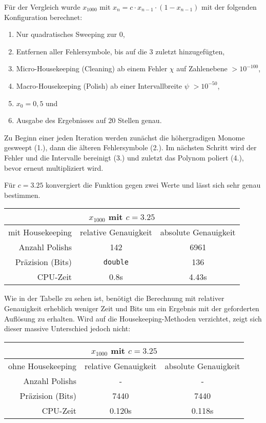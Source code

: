 Für der Vergleich wurde $x_{1000}$ mit $x_n = c \cdot x_{n-1} \cdot (1 - x_{n-1})$ mit der folgenden Konfiguration berechnet:
\begin{enumerate}
 \item Nur quadratisches Sweeping zur 0,
 \item Entfernen aller Fehlersymbole, bis auf die 3 zuletzt hinzugefügten,
 \item Micro-Housekeeping (Cleaning) ab einem Fehler $\chi$ auf Zahlenebene $>10^{-100}$,
 \item Macro-Housekeeping (Polish) ab einer Intervallbreite $\psi$ $>10^{-50}$,
 \item $x_0 = 0,5$ und
 \item Ausgabe des Ergebnisses auf 20 Stellen genau.
\end{enumerate}
Zu Beginn einer jeden Iteration werden zunächst die höhergradigen Monome gesweept (1.), dann die älteren Fehlersymbole (2.). Im nächsten Schritt wird der Fehler und die Intervalle bereinigt (3.) und zuletzt das Polynom poliert (4.), bevor erneut multipliziert wird. 

Für $c = 3.25$ konvergiert die Funktion gegen zwei Werte und lässt sich sehr genau bestimmen.

\begin{center}
\begin{tabular}{|r|c|c|}
\hline
\multicolumn{3}{|c|}{$x_{1000}$ mit $c=3.25$}\\
\hline
 mit Housekeeping&relative Genauigkeit & absolute Genauigkeit \\
 \hline
 \hline
 Anzahl Polishs & 142 & 6961 \\
 Präzision (Bits) & \verb+double+ & 136 \\
 CPU-Zeit & 0.8s & 4.43s\\
 \hline
\end{tabular}
\end{center}

Wie in der Tabelle zu sehen ist, benötigt die Berechnung mit relativer Genauigkeit erheblich weniger Zeit und Bits um ein Ergebnis mit der geforderten Auflösung zu erhalten. Wird auf die Housekeeping-Methoden verzichtet, zeigt sich dieser massive Unterschied jedoch nicht:

\begin{center}
\begin{tabular}{|r|c|c|}
\hline
\multicolumn{3}{|c|}{$x_{1000}$ mit $c=3.25$}\\
\hline
 ohne Housekeeping &relative Genauigkeit & absolute Genauigkeit \\
 \hline
 \hline
 Anzahl Polishs & -& -\\
 Präzision (Bits) & 7440 & 7440 \\
 CPU-Zeit & 0.120s & 0.118s\\
 \hline
\end{tabular}
\end{center}

